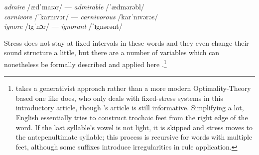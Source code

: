 \ex
	\textit{admire} /ædˈmaɪər/ --- \textit{admirable} /ˈædmərəbl/\\
	\textit{carnivore} /ˈkarnɪvɔr/ --- \textit{carnivorous} /karˈnɪvərəs/\\
	\textit{ignore} /ɪgˈnɔr/ --- \textit{ignorant} /ˈɪgnərənt/
\xe

Stress does not stay at fixed intervals in these words and they even change 
their sound structure a little, but there are a number of variables which can 
nonetheless be formally described and applied here 
\citep[564--565]{halle1998}.\footnote{\citet{halle1998} takes a 
generativist approach rather than a more modern Optimality-Theory based one 
like \citet{kager2007} does, who only deals with fixed-stress systems in this 
introductory article, though \citeauthor{halle1998}'s article is still 
informative. Simplifying a lot, English essentially tries to construct trochaic 
feet from the right edge of the word. If the last syllable's vowel is not light, 
it is skipped and stress moves to the antepenultimate syllable; this process is 
recursive for words with multiple feet, although some suffixes introduce 
irregularities in rule application.} 
% 
% 
